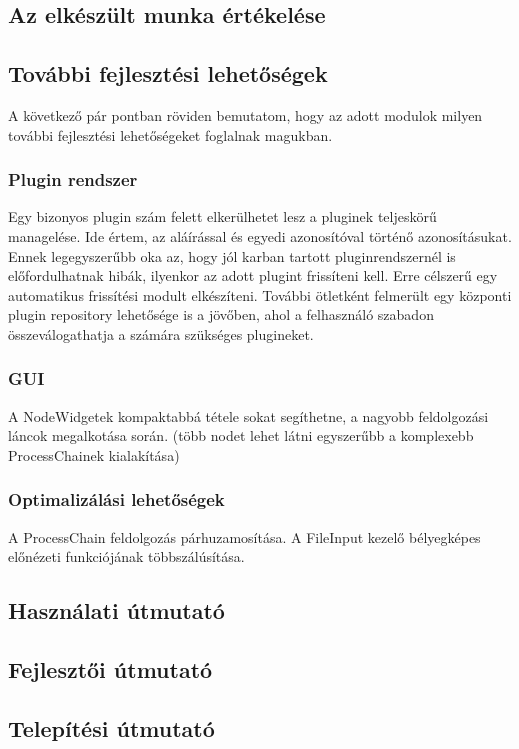 \documentclass[a4paper,12pt,oneside]{report}
\begin{document}
\subsection{Az elkészült munka értékelése}



\subsection{További fejlesztési lehetőségek}
A következő pár pontban röviden bemutatom, hogy az adott modulok milyen további fejlesztési lehetőségeket foglalnak magukban.
\subsubsection{Plugin rendszer}
Egy bizonyos plugin szám felett elkerülhetet lesz a pluginek teljeskörű managelése. Ide értem, az aláírással és egyedi azonosítóval történő azonosításukat. Ennek legegyszerűbb oka az, hogy jól karban tartott pluginrendszernél is előfordulhatnak hibák, ilyenkor az adott plugint frissíteni kell. Erre célszerű egy automatikus frissítési modult elkészíteni. További ötletként felmerült egy központi plugin repository lehetősége is a jövőben, ahol a felhasználó szabadon összeválogathatja a számára szükséges plugineket.
\subsubsection{GUI}
A NodeWidgetek kompaktabbá tétele sokat segíthetne, a nagyobb feldolgozási láncok megalkotása során. (több nodet lehet látni egyszerűbb a komplexebb ProcessChainek kialakítása)
\subsubsection{Optimalizálási lehetőségek}
A ProcessChain feldolgozás párhuzamosítása. A FileInput kezelő bélyegképes előnézeti funkciójának többszálúsítása.

\subsection{Használati útmutató}

\subsection{Fejlesztői útmutató}

\subsection{Telepítési útmutató}
\end{document}
